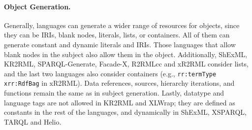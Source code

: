 \noindent\paragraph{\textbf{Object Generation.}} %
Generally, languages can generate a wider range of resources for objects, since they can be IRIs, blank nodes, literals, lists, or containers. All of them can generate constant and dynamic literals and IRIs. Those languages that allow blank nodes in the subject also allow them in the object. Additionally, ShExML, KR2RML, SPARQL-Generate, Facade-X, R2RMLcc and xR2RML consider lists, and the last two languages also consider containers (e.g., \texttt{rr:termType xrr:RdfBag} in xR2RML). Data references, sources, hierarchy iterations, and functions remain the same as in subject generation. Lastly, datatype and language tags are not allowed in KR2RML and XLWrap; they are defined as constants in the rest of the languages, and dynamically in ShExML, XSPARQL, TARQL and Helio.

%







